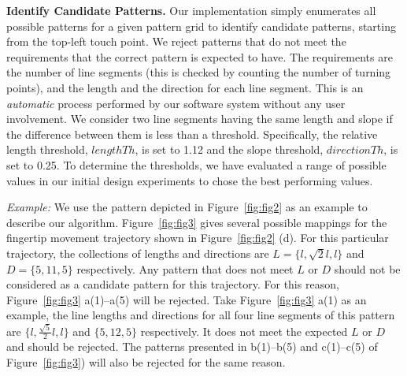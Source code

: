        \noindent \textbf{Identify Candidate Patterns.} Our implementation simply enumerates all possible
        patterns for a given pattern grid to identify candidate patterns, starting from the top-left touch point.
        We reject patterns that do not meet the requirements that the correct pattern is expected to have. The requirements are the number of line segments (this is checked by counting the number of turning points), and the length and the direction for each
        line segment.
        This is an \emph{automatic} process performed by our software system without any user involvement.
       We consider two line segments having the same length and slope if the difference between them is less
       than a threshold. Specifically, the relative length threshold, $lengthTh$, is set to 1.12 and the slope threshold, $directionTh$, is set to 0.25.
       To determine the thresholds, we have evaluated a range of possible values in our initial design experiments to chose the best performing values.

       \vspace{2mm}
       \noindent \emph{Example:} We use the pattern depicted in Figure~\ref{fig:fig2} as an example to
       describe our algorithm. Figure~\ref{fig:fig3} gives several
       possible mappings for the fingertip movement trajectory shown in Figure~\ref{fig:fig2} (d). For this particular trajectory, the collections of lengths and directions are
       $L=\{l, \sqrt{2}l, l\}$ and $D=\{5, 11, 5\}$ respectively. Any pattern that does not meet $L$ or $D$ should not be considered as a candidate pattern for this trajectory.
       For this reason, Figure~\ref{fig:fig3} a(1)--a(5) will be rejected. Take Figure~\ref{fig:fig3} a(1) as an example,
       the line lengths and directions for all four line segments of this pattern are  $\{l,
       \frac{\sqrt{5}}{2}l, l\}$ and $\{5,12,5\}$ respectively. It does not meet the expected $L$ or $D$ and should be rejected.
       The patterns presented in b(1)--b(5) and c(1)--c(5) of Figure~\ref{fig:fig3}) will
       also be rejected for the same reason.
    
